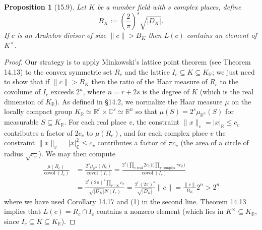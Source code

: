 \documentclass[UTF8,11pt]{ctexart}
\newtheorem*{proposition}{Proposition}
\newcommand{\covol}{\operatorname{covol}}
\begin{document}
\begin{proposition}[15.9]
Let $K$ be a number field with $s$ complex places, define
\[
B_K:=\left(\frac2\pi\right)^s\sqrt{|D_K|}.
\]
If $c$ is an Arakelov divisor of size $\|c\|>B_K$ then $L(c)$ contains an element of $K^\times$.
\end{proposition}
\begin{proof}
Our strategy is to apply Minkowski's lattice point theorem (see Theorem 14.13) to the convex symmetric set $R_c$ and the lattice $I_c\subseteq K\subseteq K_{\mathbb R}$; we just need to show that if $\|c\|>B_K$ then the ratio of the Haar measure of $R_c$ to the covolume of $I_c$ exceeds $2^n$, where $n=r+2s$ is the degree of $K$ (which is the real dimension of $K_{\mathbb R}$). As defined in \S14.2, we normalize the Haar measure $\mu$ on the locally compact group $K_{\mathbb R}\simeq\mathbb R^r\times\mathbb C^s\simeq\mathbb R^n$ so that $\mu(S)=2^s\mu_{\mathbb R^n}(S)$ for measurable $S\subseteq K_{\mathbb R}$. For each real place $v$, the constraint $\|x\|_v=|x|_{\mathbb R}\leq c_v$ contributes a factor of $2c_v$ to $\mu(R_c)$, and for each complex place $v$ the constraint $\|x\|_v=|x|_{\mathbb C}^2\leq c_v$ contributes a factor of $\pi c_v$ (the area of a circle of radius $\sqrt{c_v}$). We may then compute
\begin{align*}
\frac{\mu(R_c)}{\covol(I_c)}
&=\frac{2^s\mu_{\mathbb R^n}(R_c)}{\covol(I_c)}
=\frac{2^s\bigl(\prod_{v\text{ real}}2c_v\bigr)\bigl(\prod_{v\text{ complex}}\pi c_v\bigr)}{\covol(I_c)}\\
&=\frac{2^r(2\pi)^s\prod_{v\mid\infty}c_v}{\sqrt{|D_K|}N(I_c)}
=\frac{2^r(2\pi)^s}{\sqrt{|D_K|}}\|c\|
=\frac{\|c\|}{B_K}2^n>2^n
\end{align*}
where we have used Corollary 14.17 and (1) in the second line. Theorem 14.13 implies that $L(c)=R_c\cap I_c$ contains a nonzero element (which lies in $K^\times\subseteq K_{\mathbb R}$, since $I_c\subseteq K\subseteq K_{\mathbb R}$).
\end{proof}
\end{document}

